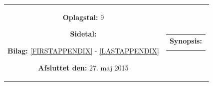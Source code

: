 \begin{titlepage}
\begin{nopagebreak}
{\begin{tabular}{cc}
{\begin{description}
						\item {\bf Oplagstal:} 9
						\item {\bf Sidetal:} \numpages
						\item {\bf Bilag:} \ref{FIRSTAPPENDIX} - \ref{LASTAPPENDIX}
						\item {\bf Afsluttet den:} 27. maj 2015
					\end{description}
					\vfill
				} &
				\parbox{7cm}{
					\vspace{.15cm}
					\hfill 
					\begin{tabular}{l}
						{\bf Synopsis:}\bigskip \\
						\fbox{
							\parbox{6.5cm}{\smallskip
								{\vfill{\small 
								\smallskip}}
							}
						}
  					\end{tabular}
  				}
			\end{tabular}
		}\\
		\\
	\end{nopagebreak}
\end{titlepage}